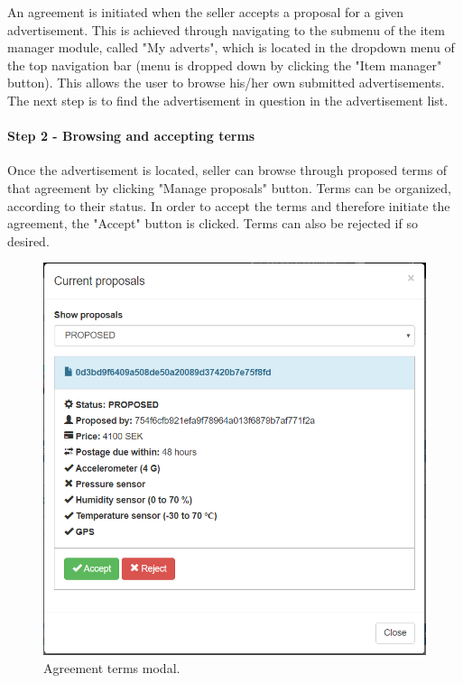 An agreement is initiated when the seller accepts a proposal for a given advertisement. This is achieved through navigating to the submenu of the item manager module, called "My adverts", which is located in the dropdown menu of the top navigation bar (menu is dropped down by clicking the "Item manager" button). This allows the user to browse his/her own submitted advertisements. The next step is to find the advertisement in question in the advertisement list.

\paragraph{Step 2 - Browsing and accepting terms}

Once the advertisement is located, seller can browse through proposed terms of that agreement by clicking "Manage proposals" button. Terms can be organized, according to their status. In order to accept the terms and therefore initiate the agreement, the "Accept" button is clicked. Terms can also be rejected if so desired.

\begin{figure}[H]
\centering
\includegraphics[scale=0.58]{app_screens/terms_accept.png}
\caption{Agreement terms modal.}
\label{fig:explorerdash}
\end{figure}

